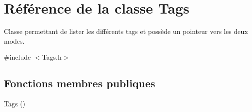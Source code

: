 \hypertarget{class_tags}{}\section{Référence de la classe Tags}
\label{class_tags}


Classe permettant de lister les différents tags et possède un pointeur vers les deux modes.  




{\ttfamily \#include $<$Tags.\+h$>$}

\subsection*{Fonctions membres publiques}
\begin{DoxyCompactItemize}
\item 
\hyperlink{class_tags_a8d3045112662e0ace4b8bafb5a3e8f57}{Tags} ()\hypertarget{class_tags_a8d3045112662e0ace4b8bafb5a3e8f57}{}\label{class_tags_a8d3045112662e0ace4b8bafb5a3e8f57}


\end{DoxyCompactItemize}
